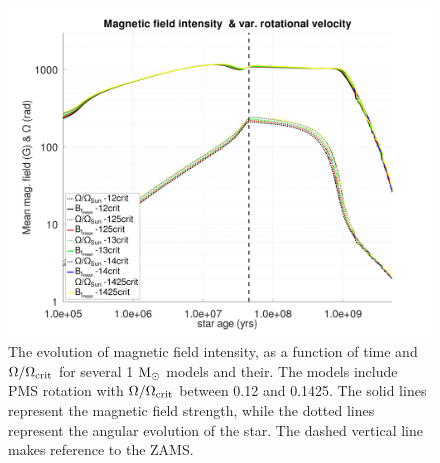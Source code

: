 \documentclass[fleqn,usenatbib]{mnras}
\begin{document}
\begin{figure}
	\includegraphics[clip,width=\columnwidth]{figures/paper2/mag_field_var_vel_g3.pdf}
    \caption{The evolution of magnetic field intensity, as a function of time and $\Omega / \Omega_{\mathrm{crit}}$ for several 1 $\mathrm{M}_\odot$ models and their. The models include PMS rotation with $\Omega / \Omega_{\mathrm{crit}}$ between 0.12 and 0.1425. The solid lines represent the magnetic field strength, while the dotted lines represent the angular evolution of the star. The dashed vertical line makes reference to the ZAMS.}
    \label{fig:mag_field_var_vel_g3}
\end{figure}
\end{document}
